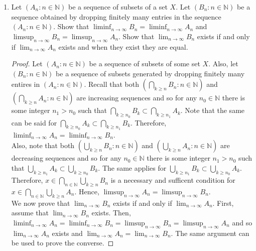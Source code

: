 \documentclass[12pt]{article}
\newcommand{\N}{\mathbb{N}}
\newenvironment{problem}[2][Problem]{\begin{trivlist}
		\item[\hskip \labelsep {\bfseries #1}\hskip \labelsep {\bfseries #2.}]}{\end{trivlist}}
\begin{document}
\begin{problem}{1.2}
	\begin{enumerate}[label=\textbf{(\alph*)}]
		\item Let $\left(A_{n}:n\in \N\right)$ be a sequence of subsets of a set $X$. Let $\left(B_{n}:n\in \N\right)$ be a sequence obtained by dropping finitely many entries in the sequence $\left(A_{n}:n \in \N\right)$. Show that $\liminf_{n\to \infty} B_{n} = \liminf_{n\to \infty} A_{n}$ and $\limsup_{n\to \infty} B_{n} = \limsup_{n\to \infty} A_{n}$. Show that $\lim_{n\to \infty} B_{n}$ exists if and only if $\lim_{n\to \infty} A_{n}$ exists and when they exist they are equal.
		\begin{proof}
			Let $\left(A_{n}:n\in \N\right)$ be a sequence of subsets of some set $X$. Also, let $\left(B_{n}:n\in \N\right)$ be a sequence of subsets generated by dropping finitely many entires in $\left(A_{n}:n\in \N\right)$.
		 Recall that both $\left(\bigcap_{k\geq n} B_{n} : n\in \N\right)$ and $\left(\bigcap_{k\geq n} A_{n} : n\in \N\right)$ are increasing sequences and so for any $n_{0}\in \N$ there is some integer $n_{1} > n_{0}$ such that $\bigcap_{k\geq n_{0}} B_{k} \subset \bigcap_{k\geq n_{1}} A_{k}$. Note that the same can be said for $\bigcap_{k\geq n_{0}} A_{k} \subset \bigcap_{k\geq n_{1}} B_{k}$. Therefore, $\liminf_{n\to \infty} A_{n} = \liminf_{n\to \infty} B_{n}$.\\
		 
		 Also, note that both $\left(\bigcup_{k\geq n} B_{n} : n\in \N\right)$ and $\left(\bigcup_{k\geq n} A_{n} : n\in \N\right)$ are decreasing sequences and so for any $n_{0} \in \N$ there is some integer $n_{1} > n_{0}$ such that $\bigcup_{k\geq n_{1}} A_{k} \subset \bigcup_{k\geq n_{0}} B_{k}$. The same applies for $\bigcup_{k\geq n_{1}} B_{k} \subset \bigcup_{k\geq n_{0}} A_{k}$. Therefore, $x\in \bigcap_{n\in \N}\bigcup_{k\geq n} B_{n}$ is a necessary and sufficent condition for $x\in \bigcap_{n\in \N}\bigcup_{k\geq n} A_{n}$. Hence, $\limsup_{n\to \infty} A_{n} = \limsup_{n\to \infty} B_{n}$. \\
		 
		 We now prove that $\lim_{n\to \infty} B_{n}$ exists if and only if $\lim_{n\to \infty} A_{n}$. First, assume that $\lim_{n\to \infty} B_{n}$ exists. Then, $\liminf_{n\to \infty} A_{n} = \liminf_{n\to \infty} B_{n} = \limsup_{n\to \infty} B_{n} = \limsup_{n\to \infty} A_{n}$ and so $\lim_{n\to \infty} A_{n}$ exists and $\lim_{n \to \infty} A_{n} = \lim_{n \to \infty} B_{n}$. The same argument can be used to prove the converse.
		\end{proof}
	

\end{enumerate}
\end{problem}
\end{document}

